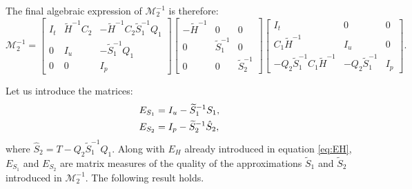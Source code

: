 \documentclass[10pt,a4paper]{amsart}
\newcommand{\Mat}[1]{#1}
\newcommand{\tH}{\widetilde{H}}
\newcommand{\tS}{\widetilde{S}}
\begin{document}
The final algebraic expression of $\mathcal{M}_2^{-1}$ is therefore:
\begin{equation}
    \mathcal{M}_2^{-1} = \left[ \begin{array}{ccc}
    I_t & \tH^{-1}C_2 & -\tH^{-1} C_2 \tS_1^{-1} Q_1 \\
    0 & I_u & -\tS_1^{-1} Q_1 \\
    0 & 0 & I_p \end{array} \right]
    \left[ \begin{array}{ccc}
    -\tH^{-1} & 0 & 0 \\
    0 & \tS_1^{-1} & 0 \\
    0 & 0 & \tS_2^{-1} \end{array} \right]
    \left[ \begin{array}{ccc}
    I_t & 0 & 0 \\
    C_1 \tH^{-1} & I_u & 0 \\
    -Q_2 \tS_1^{-1} C_1 \tH^{-1} & -Q_2 \tS_1^{-1} & I_p \end{array} \right].
    \label{eq:P2}
\end{equation}

Let us introduce the matrices:
\begin{subequations}
\begin{align}
    E_{S_1} &= I_u - \tS_1^{-1} S_1, \label{eq:ES1} \\
    E_{S_2} &= I_p - \tS_2^{-1} \hat{S}_2, \label{eq:ES2}
\end{align}
\label{eq:E2def}\null
\end{subequations}
where $\hat{S}_2=T-Q_2\tS_1^{-1}Q_1$. Along with $E_H$ already introduced in equation \eqref{eq:EH}, $E_{S_1}$ and $E_{S_2}$ are matrix measures of the quality of the approximations $\tS_1$ and $\tS_2$ introduced in $\mathcal{M}_2^{-1}$. The following result holds.
\end{document}
